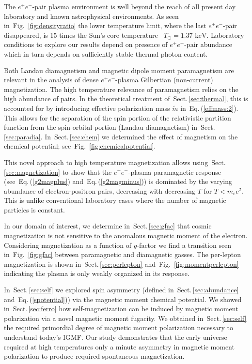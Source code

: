 \documentclass[aps,prd,floatfix,reprint]{revtex4-2}
\newcommand*{\keV}{\text{ keV}}
\newcommand{\req}[1]{Eq.\,(\ref{#1})}
\newcommand{\rf}[1]{Fig.~{\ref{#1}}}
\newcommand{\rsec}[1]{Sect.\,{\ref{#1}}}
\begin{document}
The $e^{+}e^{-}$-pair plasma environment is well beyond the reach of all present day laboratory and known astrophysical environments. As seen in~\rf{fig:densityratio} the lower temperature limit, where the last $e^{+}e^{-}$-pair disappeared, is 15 times the Sun's core temperature~\cite{Bahcall:2000nu} $T_{\odot}=1.37\keV$. Laboratory conditions to explore our results depend on presence of $e^{+}e^{-}$-pair abundance which in turn depends on sufficiently stable thermal photon content.

Both Landau diamagnetism and magnetic dipole moment paramagnetism are relevant in the analysis of dense $e^{+}e^{-}$-plasma Gilbertian (non-current) magnetization. The high temperature relevance of paramagnetism relies on the high abundance of pairs. In the theoretical treatment of~\rsec{sec:thermal}, this is accounted for by introducing effective polarization mass $\tilde{m}$ in~\req{effmass:2}. This allows for the separation of the spin portion of the relativistic partition function from the spin-orbital portion (Landau diamagnetism) in~\rsec{sec:paradia}. In~\rsec{sec:chem} we determined the effect of magnetism on the chemical potential; 
see~\rf{fig:chemicalpotential}.

This novel approach to high temperature magnetization allows using~\rsec{sec:magnetization} to show that the $e^{+}e^{-}$-plasma paramagnetic response (see~\req{g2magplus} and~\req{g2magminus}) is dominated by the varying abundance of electron-positron pairs, decreasing with decreasing $T$ for $T<m_{e}c^2$. This is unlike conventional laboratory cases where the number of magnetic particles is constant. 

In our domain of interest, we determine in~\rsec{sec:gfac} that cosmic magnetization is not sensitive to the anomalous magnetic moment of the electron. Considering magnetization as a function of $g$-factor we find a transition seen in~\rf{fig:gfac} between paramagnetic and diamagnetic gasses. The per-lepton magnetization is shown in~\rsec{sec:perlepton} and~\rf{fig:momentperlepton} indicating the plasma is only weakly organized in its response.

In~\rsec{sec:self} we explored spin asymmetry (defined in~\rsec{sec:abundance} and~\req{spotential}) via the magnetic moment  chemical potential. We showed in~\rsec{sec:ferro} how self-magnetization can be induced by magnetic moment polarization via a novel magnetic moment fugacity. We obtained in~\rsec{sec:self} the required primordial degree of magnetic moment polarization necessary to understand today's IGMF. Our study demonstrates that the early universe required at high temperatures only a minute asymmetry in magnetic moment polarization to produce required spontaneous magnetization.
\end{document}
